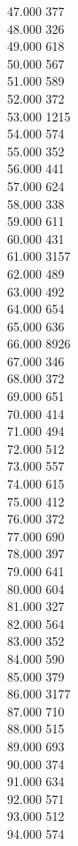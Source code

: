 { 47.000	377 \\
 48.000	326 \\
 49.000	618 \\
 50.000	567 \\
 51.000	589 \\
 52.000	372 \\
 53.000	1215 \\
 54.000	574 \\
 55.000	352 \\
 56.000	441 \\
 57.000	624 \\
 58.000	338 \\
 59.000	611 \\
 60.000	431 \\
 61.000	3157 \\
 62.000	489 \\
 63.000	492 \\
 64.000	654 \\
 65.000	636 \\
 66.000	8926 \\
 67.000	346 \\
 68.000	372 \\
 69.000	651 \\
 70.000	414 \\
 71.000	494 \\
 72.000	512 \\
 73.000	557 \\
 74.000	615 \\
 75.000	412 \\
 76.000	372 \\
 77.000	690 \\
 78.000	397 \\
 79.000	641 \\
 80.000	604 \\
 81.000	327 \\
 82.000	564 \\
 83.000	352 \\
 84.000	590 \\
 85.000	379 \\
 86.000	3177 \\
 87.000	710 \\
 88.000	515 \\
 89.000	693 \\
 90.000	374 \\
 91.000	634 \\
 92.000	571 \\
 93.000	512 \\
 94.000	574 \\
}
